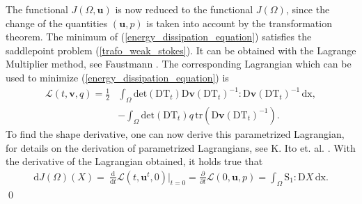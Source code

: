 \begin{proof*}
The functional $J(\Omega,\mathbf{u})$ is now reduced to the functional $J(\Omega)$, since the change of the quantities $(\mathbf{u},p)$
is taken into account by the transformation theorem. The minimum of (\ref{energy_dissipation_equation})
satisfies the saddlepoint problem (\ref{trafo_weak_stokes}). It can be obtained with the Lagrange Multiplier method, 
see Faustmann \cite{lecture_notes_faustmann_numPDE}. The corresponding Lagrangian which can be used to minimize (\ref{energy_dissipation_equation})
is
\begin{equation}\label{parametrized_lagrangian}
 \begin{aligned}
	\mathcal{L}(t,\mathbf{v}, q) = \frac{1}{2}& \int_{\Omega} \mathrm{det}(\mathrm{DT}_t) \mathrm{D} \mathbf{v}(\mathrm{DT}_t)^{-1} :
	\mathrm{D} \mathbf{v}(\mathrm{DT}_t)^{-1} \, \mathrm{dx}, \\
	&- \int_{\Omega}\mathrm{det}(\mathrm{DT}_t)q \, \mathrm{tr} \left( \mathrm{D}\mathbf{v}(\mathrm{DT}_t)^{-1} \right).
\end{aligned}
\end{equation}
To find the shape derivative, one can now derive this parametrized Lagrangian, for details on the derivation of parametrized Lagrangians, 
see K. Ito et. al. \cite{lagrangian_derivative}. With the derivative of the Lagrangian obtained, it holds true that
\begin{align}
	\mathrm{d}J(\Omega)(X) =\ \frac{\mathrm{d}}{\mathrm{d}t} \mathcal{L}(t, \mathbf{u}^t, 0)\big\rvert_{t=0}  =
	\frac{\partial}{\partial t}\mathcal{L}(0,\mathbf{u},p) = \int_{\Omega} \mathrm{S}_1 : \mathrm{D}X \, \mathrm{dx}.
\end{align}
\qed
\end{proof*}